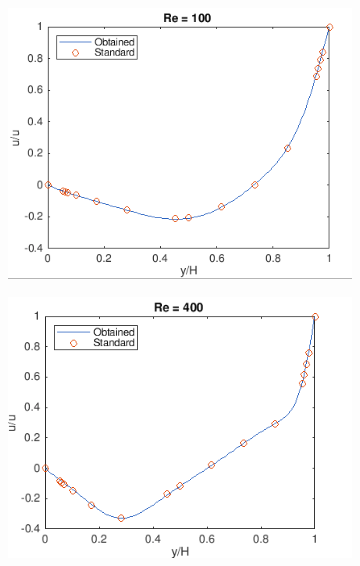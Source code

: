 \documentclass{article}
\begin{document}
\begin{figure}
  \begin{subfigure}[b]{0.3\textwidth}
    \includegraphics[width=\textwidth]{31.png}
  \end{subfigure}
  \begin{subfigure}[b]{0.3\textwidth}
    \includegraphics[width=\textwidth]{32.png}
  \end{subfigure}
 \begin{subfigure}[b]{0.3\textwidth}

\end{subfigure}
\end{figure}
\end{document}
